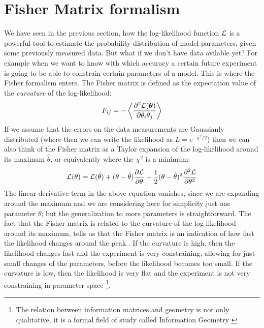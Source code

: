 \section{Fisher Matrix formalism}
We have seen in the previous section, how the log-likelihood function $\mathcal{L}$ is a powerful
tool to estimate the probability distribution of model parameters, given some previously measured data.
But what if we don't have data avilable yet? For example when we want to know 
with which accuracy a certain future experiment is going to be able to constrain certain parameters of
a model. 
This is where the Fisher formalism \cite{(cite Fisher, Tegmark, etc.)} enters.
The Fisher matrix is defined as the expectation value of the \emph{curvature} of the log-likelihood:
\begin{equation}\label{eq:Fishermatrix-definition}
F_{ij} = -\left< \frac{\partial^2 \mathcal{L}(\bm{\theta})}{\partial \theta_i \theta_j} \right>
\end{equation}
If we assume that the errors on the data measurements are Gaussianly distributed (where then we can write the likelihood as 
$L = e^{-\chi^2 / 2}$) then we can also think of the Fisher matrix as a Taylor expansion of the log-likelihood around its maximum
$\hat \theta$, or equivalently where the $\chi^2$ is a minimum:
\begin{equation}
\mathcal{L}(\theta) = \mathcal{L}(\hat \theta) + (\theta - \hat \theta)\frac{\partial{\mathcal{L}}}{\partial{\theta}} + 
\frac{1}{2}(\theta - \hat \theta)^2 \frac{\partial^2{\mathcal{L}}}{\partial{\theta}^2}
\end{equation}
The linear derivative term in the above equation vanishes, since we are expanding around the maximum and we are considering here 
for simplicity just one parameter $\theta$; but the generalization to more parameters is straightforward.
The fact that the Fisher matrix is related to the curvature of the log-likelihood around its maximum, tells us that the Fisher matrix 
is an indication of how fast the likelihood changes around the peak \cite{cite Dodelson...}. 
If the curvature is high, then the likelihood changes
fast and the experiment is very constraining, allowing for just small changes of the parameters, before the likelihood becomes too small.
If the curvature is low, then the likelihood is very flat and the experiment is not very constraining in parameter 
space \footnote{The relation between information matrices and geometry is not only qualitative, it is a 
formal field of study called Information Geometry \cite{cite Springer book}}.

